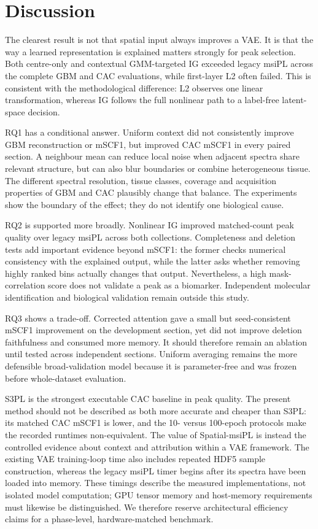 \section{Discussion}
\label{sec:discussion}

The clearest result is not that spatial input always improves a VAE. It is that
the way a learned representation is explained matters strongly for peak
selection. Both centre-only and contextual GMM-targeted IG exceeded legacy
msiPL across the complete GBM and CAC evaluations, while first-layer L2 often
failed. This is consistent with the methodological difference: L2 observes one
linear transformation, whereas IG follows the full nonlinear path to a
label-free latent-space decision.

RQ1 has a conditional answer. Uniform context did not consistently improve GBM
reconstruction or mSCF1, but improved CAC mSCF1 in every paired section. A
neighbour mean can reduce local noise when adjacent spectra share relevant
structure, but can also blur boundaries or combine heterogeneous tissue. The
different spectral resolution, tissue classes, coverage and acquisition
properties of GBM and CAC plausibly change that balance. The experiments show
the boundary of the effect; they do not identify one biological cause.

RQ2 is supported more broadly. Nonlinear IG improved matched-count peak quality
over legacy msiPL across both collections. Completeness and deletion tests add
important evidence beyond mSCF1: the former checks numerical consistency with
the explained output, while the latter asks whether removing highly ranked bins
actually changes that output. Nevertheless, a high mask-correlation score does
not validate a peak as a biomarker. Independent molecular identification and
biological validation remain outside this study.

RQ3 shows a trade-off. Corrected attention gave a small but seed-consistent
mSCF1 improvement on the development section, yet did not improve deletion
faithfulness and consumed more memory. It should therefore remain an ablation
until tested across independent sections. Uniform averaging remains the more
defensible broad-validation model because it is parameter-free and was frozen
before whole-dataset evaluation.

S3PL is the strongest executable CAC baseline in peak quality. The present
method should not be described as both more accurate and cheaper than S3PL: its
matched CAC mSCF1 is lower, and the 10- versus 100-epoch protocols make the
recorded runtimes non-equivalent. The value of Spatial-msiPL is instead the
controlled evidence about context and attribution within a VAE framework.
The existing VAE training-loop time also includes repeated HDF5 sample
construction, whereas the legacy msiPL timer begins after its spectra have
been loaded into memory. These timings describe the measured implementations,
not isolated model computation; GPU tensor memory and host-memory requirements
must likewise be distinguished. We therefore reserve architectural efficiency
claims for a phase-level, hardware-matched benchmark.


